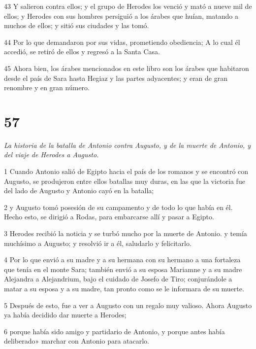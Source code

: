 \par 43 Y salieron contra ellos; y el grupo de Herodes los venció y mató a nueve mil de ellos; y Herodes con sus hombres persiguió a los árabes que huían, matando a muchos de ellos; y sitió sus ciudades y las tomó.

\par 44 Por lo que demandaron por sus vidas, prometiendo obediencia; A lo cual él accedió, se retiró de ellos y regresó a la Santa Casa.

\par 45 Ahora bien, los árabes mencionados en este libro son los árabes que habitaron desde el país de Sara hasta Hegiaz y las partes adyacentes; y eran de gran renombre y en gran número.


\chapter{57}

\par \textit{La historia de la batalla de Antonio contra Augusto, y de la muerte de Antonio, y del viaje de Herodes a Augusto.}

\par 1 Cuando Antonio salió de Egipto hacia el país de los romanos y se encontró con Augusto, se produjeron entre ellos batallas muy duras, en las que la victoria fue del lado de Augusto y Antonio cayó en la batalla;

\par 2 y Augusto tomó posesión de su campamento y de todo lo que había en él. Hecho esto, se dirigió a Rodas, para embarcarse allí y pasar a Egipto.

\par 3 Herodes recibió la noticia y se turbó mucho por la muerte de Antonio. y temía muchísimo a Augusto; y resolvió ir a él, saludarlo y felicitarlo.

\par 4 Por lo que envió a su madre y a su hermana con su hermano a una fortaleza que tenía en el monte Sara; también envió a su esposa Mariamne y a su madre Alejandra a Alejandrium, bajo el cuidado de Josefo de Tiro; conjurándole a matar a su esposa y a su madre, tan pronto como se le informara de su muerte.

\par 5 Después de esto, fue a ver a Augusto con un regalo muy valioso. Ahora Augusto ya había decidido dar muerte a Herodes;

\par 6 porque había sido amigo y partidario de Antonio, y porque antes había deliberado» marchar con Antonio para atacarlo.

